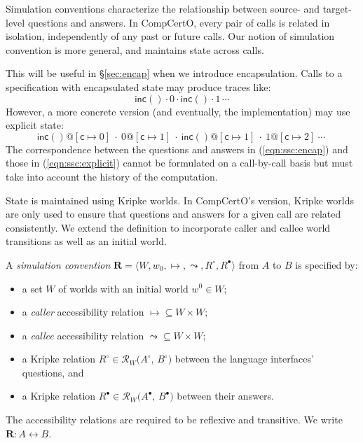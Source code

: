 \documentclass[acmsmall,screen,review,anonymous]{acmart}
\newcommand{\kw}[1]{\ensuremath{ \mathsf{#1} }}
\newcommand{\que}{\circ}
\newcommand{\ans}{\bullet}
\newcommand{\intl}[1]{#1^0}
\begin{document}
Simulation conventions
characterize the relationship between
source- and target-level
questions and answers.
In CompCertO,
every pair of calls is related in isolation,
independently of any past or future calls.
Our notion of simulation convention
is more general,
and maintains state across calls.

\begin{remark} \label{rem:base:ssc} %
This will be useful in \S\ref{sec:encap}
when we introduce encapsulation.
Calls to a specification with encapsulated state
may produce traces like:
\begin{equation} \label{eqn:ssc:encap}
  \kw{inc}() \cdot 0 \cdot \kw{inc}() \cdot 1 \,\cdots {}
\end{equation}
However, a more concrete version (and eventually, the implementation)
may use explicit state:
\begin{equation} \label{eqn:ssc:explicit}
  \kw{inc}()@[\kw{c} \mapsto 0] \:\cdot\:
  0@[\kw{c} \mapsto 1] \:\cdot\:
  \kw{inc}()@[\kw{c} \mapsto 1] \:\cdot\:
  1@[\kw{c} \mapsto 2] \:\cdots\: {}
\end{equation}
The correspondence between
the questions and answers in (\ref{eqn:ssc:encap})
and those in (\ref{eqn:ssc:explicit})
cannot be formulated on a call-by-call basis
but must take into account the history of the computation.
\end{remark}

State is maintained using Kripke worlds.
In CompCertO's version,
Kripke worlds are only used to ensure that
questions and answers for a given call
are related consistently.
We extend the definition to incorporate
caller and callee world transitions
as well as an initial world.

\begin{definition} \label{def:sconv} %
A \emph{simulation convention}
$\mathbf{R} = \langle W, w_0, {\mapsto}, {\leadsto}, R^\que, R^\ans \rangle$
from $A$ to $B$ is specified by:
\begin{itemize}
  \item a set $W$ of worlds
    with an initial world $\intl{w} \in W$;
  \item a \emph{caller} accessibility relation ${\mapsto} \subseteq W \times W$;
  \item a \emph{callee} accessibility relation ${\leadsto} \subseteq W \times W$;
  \item a Kripke relation $R^\que \in \mathcal{R}_W\big(A^\que,\, B^\que\big)$
    between the language interfaces' questions, and
  \item a Kripke relation $R^\ans \in \mathcal{R}_W\big(A^\ans,\, B^\ans\big)$
    between their answers.
\end{itemize}
The accessibility relations are required to be reflexive and transitive.
We write $\mathbf{R} : A \leftrightarrow B$.
\end{definition}
\end{document}
